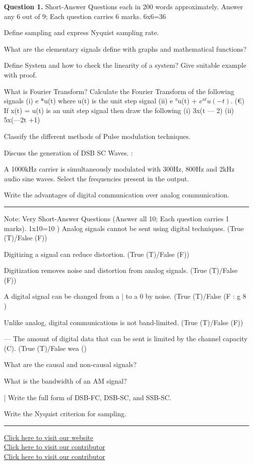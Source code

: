 \documentclass[11pt,a4paper]{article}
\begin{document}
\medskip\noindent\textbf{Question 1.} Short-Answer Questions each in 200 words approximately. Answer any 6 out
of 9; Each question carries 6 marks. 6x6=36
\begin{parts}
  \item Define sampling and express Nyquist sampling rate.
  \item What are the elementary signals define with graphs and mathematical functions?
  \item Define System and how to check the linearity of a system? Give suitable example with proof.
  \item What is Fourier Transform? Calculate the Fourier Transform of the following signals (i)
  e *u(t) where u(t) is the unit step signal (ii) e °u(t) + $e^{at}u(-t)$.
  (€) If x(t) = u(t) is an unit step signal then draw the following (i) 3x(t — 2) (ii) 5x(—2t +1)
  \item Classify the different methods of Pulse modulation techniques.
  \item Discuss the generation of DSB SC Waves. :
  \item A 1000kHz carrier is simultaneously modulated with 300Hz, 800Hz and 2kHz audio sine waves.
  Select the frequencies present in the output.
  \item Write the advantages of digital communication over analog communication.
\end{parts}

\bigskip{}
\rule{\linewidth}{0.4pt}\smallskip

Note: Very Short-Answer Questions (Answer all 10; Each question carries 1 marks).
1x10=10
) Analog signals cannot be sent using digital techniques. (True (T)/False (F))
  \begin{parts}
    \item Digitizing a signal can reduce distortion. (True (T)/False (F))
    \item Digitization removes noise and distortion from analog signals. (True (T)/False (F))
    \item A digital signal can be changed from a | to a 0 by noise. (True (T)/False (F :
    g 8 )
    \item Unlike analog, digital communications is not band-limited. (True (T)/False (F))
    \item — The amount of digital data that can be sent is limited by the channel capacity (C). (True (T)/False
    wea ()
    \item What are the causal and non-causal signals?
    \item What is the bandwidth of an AM signal?
    \item | Write the full form of DSB-FC, DSB-SC, and SSB-SC.
    \item Write the Nyquist criterion for sampling.
  \end{parts}

\vfill
\rule{\linewidth}{0.4pt}
\begin{center}\small
\href{https://bhu-exam.vercel.app/}{Click here to visit our website}\\[4pt]\href{https://me-aryan.vercel.app/}{Click here to visit our contributor}\\[4pt]\href{https://quashan-me.vercel.app/}{Click here to visit our contributor}
\end{center}
\end{document}
